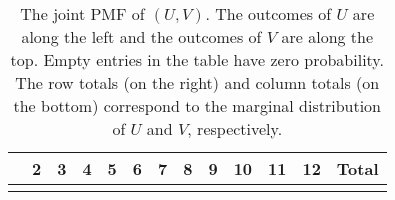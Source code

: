 \documentclass[]{book}
\numberwithin{equation}{chapter}
\numberwithin{figure}{chapter}
\theoremstyle{plain}
\theoremstyle{definition}
\theoremstyle{remark}
\theoremstyle{definition}
\theoremstyle{definition}
\theoremstyle{remark}
\begin{document}
\begin{longtable}[]{@{}lllllllllllll@{}}
\caption{The joint PMF of \((U,V)\). The outcomes of \(U\) are along the
left and the outcomes of \(V\) are along the top. Empty entries in the
table have zero probability. The row totals (on the right) and column
totals (on the bottom) correspond to the marginal distribution of \(U\)
and \(V\), respectively.}\tabularnewline
\toprule
\begin{minipage}[b]{0.02\columnwidth}\raggedright\strut
\strut
\end{minipage} & \begin{minipage}[b]{0.05\columnwidth}\raggedright\strut
2\strut
\end{minipage} & \begin{minipage}[b]{0.05\columnwidth}\raggedright\strut
3\strut
\end{minipage} & \begin{minipage}[b]{0.05\columnwidth}\raggedright\strut
4\strut
\end{minipage} & \begin{minipage}[b]{0.05\columnwidth}\raggedright\strut
5\strut
\end{minipage} & \begin{minipage}[b]{0.05\columnwidth}\raggedright\strut
6\strut
\end{minipage} & \begin{minipage}[b]{0.05\columnwidth}\raggedright\strut
7\strut
\end{minipage} & \begin{minipage}[b]{0.05\columnwidth}\raggedright\strut
8\strut
\end{minipage} & \begin{minipage}[b]{0.05\columnwidth}\raggedright\strut
9\strut
\end{minipage} & \begin{minipage}[b]{0.05\columnwidth}\raggedright\strut
10\strut
\end{minipage} & \begin{minipage}[b]{0.05\columnwidth}\raggedright\strut
11\strut
\end{minipage} & \begin{minipage}[b]{0.05\columnwidth}\raggedright\strut
12\strut
\end{minipage} & \begin{minipage}[b]{0.05\columnwidth}\raggedright\strut
Total\strut
\end{minipage}\tabularnewline
\midrule
\endfirsthead
\toprule
\begin{minipage}[b]{0.02\columnwidth}\raggedright\strut

\end{minipage}
\end{longtable}
\end{document}
